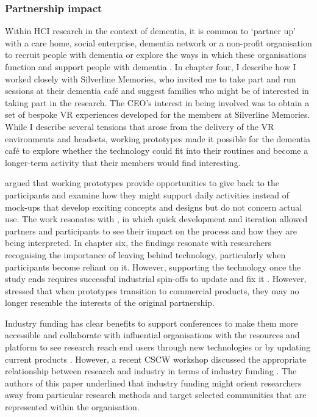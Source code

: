 \subsubsection{Partnership impact}
Within HCI research in the context of dementia, it is common to `partner up' with a care home, social enterprise, dementia network or a non-profit organisation to recruit people with dementia or explore the ways in which these organisations function and support people with dementia \citep{bartlett2019strategies}. In chapter four, I describe how I worked closely with Silverline Memories, who invited me to take part and run sessions at their dementia café and suggest families who might be of interested in taking part in the research. The CEO's interest in being involved was to obtain a set of bespoke VR experiences developed for the members at Silverline Memories. While I describe several tensions that arose from the delivery of the VR environments and headsets, working prototypes made it possible for the dementia café to explore whether the technology could fit into their routines and become a longer-term activity that their members would find interesting. 

\cite{bodker2018participatory} argued that working prototypes provide opportunities to give back to the participants and examine how they might support daily activities instead of mock-ups that develop exciting concepts and designs but do not concern actual use. The work resonates with \cite{lindsay_empathy_2012}, in which quick development and iteration allowed partners and participants to see their impact on the process and how they are being interpreted. In chapter six, the findings resonate with researchers recognising the importance of leaving behind technology, particularly when participants become reliant on it. However, supporting the technology once the study ends requires successful industrial spin-offs to update and fix it \citep{gitau2009fair}. However, \cite{chilana2015user} stressed that when prototypes transition to commercial products, they may no longer resemble the interests of the original partnership.

Industry funding has clear benefits to support conferences to make them more accessible and collaborate with influential organisations with the resources and platform to see research reach end users through new technologies or by updating current products \citep{grudin2017tool}. However, a recent CSCW workshop discussed the appropriate relationship between research and industry in terms of industry funding \citep{group_patron_2019}. The authors of this paper underlined that industry funding might orient researchers away from particular research methods and target selected communities that are represented within the organisation.

